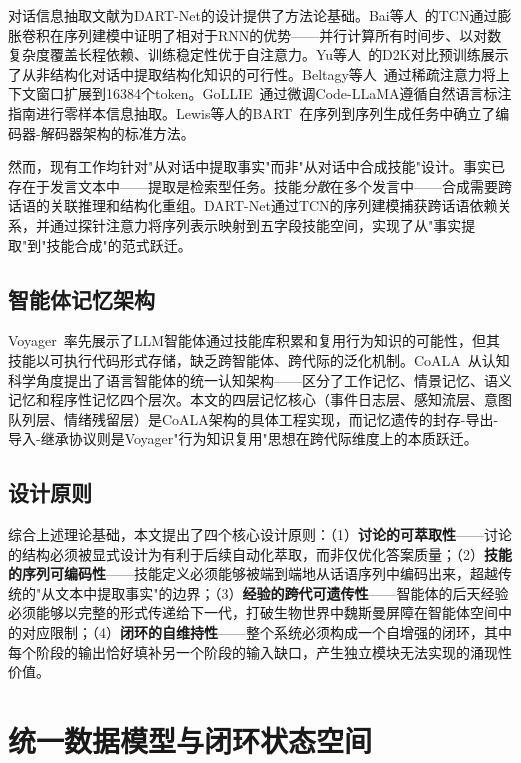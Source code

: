 \documentclass[12pt,a4paper]{ctexart}
\begin{document}
对话信息抽取文献为DART-Net的设计提供了方法论基础。Bai等人~\cite{bai2018tcn}的TCN通过膨胀卷积在序列建模中证明了相对于RNN的优势——并行计算所有时间步、以对数复杂度覆盖长程依赖、训练稳定性优于自注意力。Yu等人~\cite{yu2022d2k}的D2K对比预训练展示了从非结构化对话中提取结构化知识的可行性。Beltagy等人~\cite{beltagy2020longformer}通过稀疏注意力将上下文窗口扩展到16384个token。GoLLIE~\cite{sainz2023gollie}通过微调Code-LLaMA遵循自然语言标注指南进行零样本信息抽取。Lewis等人的BART~\cite{lewis2019bart}在序列到序列生成任务中确立了编码器-解码器架构的标准方法。

然而，现有工作均针对"从对话中提取事实"而非"从对话中合成技能"设计。事实已存在于发言文本中——提取是检索型任务。技能\emph{分散}在多个发言中——合成需要跨话语的关联推理和结构化重组。DART-Net通过TCN的序列建模捕获跨话语依赖关系，并通过探针注意力将序列表示映射到五字段技能空间，实现了从"事实提取"到"技能合成"的范式跃迁。

\subsection{智能体记忆架构}

Voyager~\cite{wang2023voyager}率先展示了LLM智能体通过技能库积累和复用行为知识的可能性，但其技能以可执行代码形式存储，缺乏跨智能体、跨代际的泛化机制。CoALA~\cite{sumers2023coala}从认知科学角度提出了语言智能体的统一认知架构——区分了工作记忆、情景记忆、语义记忆和程序性记忆四个层次。本文的四层记忆核心（事件日志层、感知流层、意图队列层、情绪残留层）是CoALA架构的具体工程实现，而记忆遗传的封存-导出-导入-继承协议则是Voyager"行为知识复用"思想在跨代际维度上的本质跃迁。

\subsection{设计原则}

综合上述理论基础，本文提出了四个核心设计原则：（1）\textbf{讨论的可萃取性}——讨论的结构必须被显式设计为有利于后续自动化萃取，而非仅优化答案质量；（2）\textbf{技能的序列可编码性}——技能定义必须能够被端到端地从话语序列中编码出来，超越传统的"从文本中提取事实"的边界；（3）\textbf{经验的跨代可遗传性}——智能体的后天经验必须能够以完整的形式传递给下一代，打破生物世界中魏斯曼屏障在智能体空间中的对应限制；（4）\textbf{闭环的自维持性}——整个系统必须构成一个自增强的闭环，其中每个阶段的输出恰好填补另一个阶段的输入缺口，产生独立模块无法实现的涌现性价值。

\section{统一数据模型与闭环状态空间}
\end{document}

